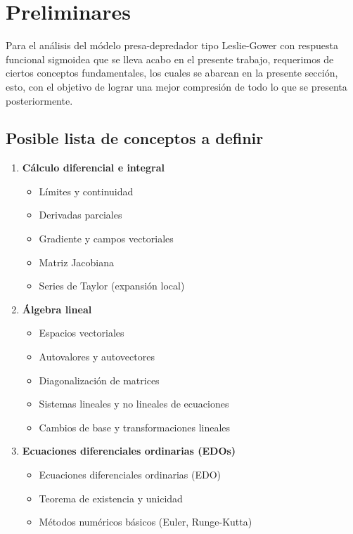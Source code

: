 \chapter{Preliminares}
    Para el análisis del módelo presa-depredador tipo Leslie-Gower con respuesta funcional sigmoidea que se lleva acabo en el presente trabajo, requerimos de ciertos conceptos fundamentales, los cuales se abarcan en la presente sección, esto, con el objetivo de lograr una mejor compresión de todo lo que se presenta posteriormente.
    
    \section*{Posible lista de conceptos a definir}
    
    \begin{enumerate}
    	\item \textbf{Cálculo diferencial e integral}
    	\begin{itemize}
    		\item Límites y continuidad
    		\item Derivadas parciales
    		\item Gradiente y campos vectoriales
    		\item Matriz Jacobiana
    		\item Series de Taylor (expansión local)
    	\end{itemize}
    	
    	\item \textbf{Álgebra lineal}
    	\begin{itemize}
    		\item Espacios vectoriales
    		\item Autovalores y autovectores \checkmark
    		\item Diagonalización de matrices \checkmark
    		\item Sistemas lineales y no lineales de ecuaciones \checkmark
    		\item Cambios de base y transformaciones lineales
    	\end{itemize}
    	
    	\item \textbf{Ecuaciones diferenciales ordinarias (EDOs)}
    	\begin{itemize}
    		\item Ecuaciones diferenciales ordinarias (EDO) \checkmark
    		\item Teorema de existencia y unicidad \checkmark
    		\item Métodos numéricos básicos (Euler, Runge-Kutta)
    	\end{itemize}
    	

\end{enumerate}

